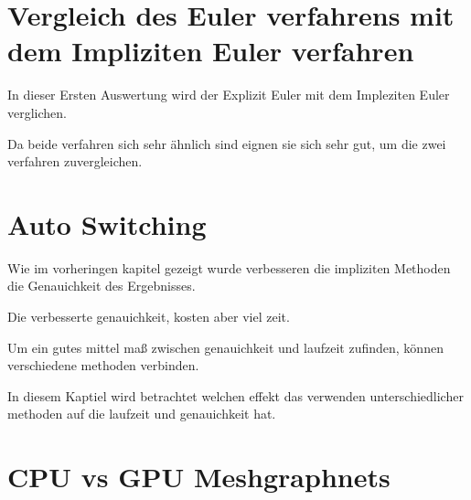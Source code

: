 


   


   
   

  
  
  
  
  
  
  
  
  
  
  
  
  
  
  
  
  
  
  
 
 
 
 
 
 
 
 
 
 
 
 
 
 
 
 
 
 
 


\section{Vergleich des Euler verfahrens mit dem Impliziten Euler verfahren}

In dieser Ersten Auswertung wird der Explizit Euler mit dem Impleziten Euler verglichen.

Da beide verfahren sich sehr ähnlich sind eignen sie sich sehr gut, um die zwei verfahren zuvergleichen.

\section{Auto Switching}

Wie im vorheringen kapitel gezeigt wurde verbesseren die impliziten Methoden die Genauichkeit des Ergebnisses.

Die verbesserte genauichkeit, kosten aber viel zeit.

Um ein gutes mittel maß zwischen genauichkeit und laufzeit zufinden, können verschiedene methoden verbinden.

In diesem Kaptiel wird betrachtet welchen effekt das verwenden unterschiedlicher methoden auf die laufzeit und genauichkeit hat.

\section{CPU vs GPU Meshgraphnets}















